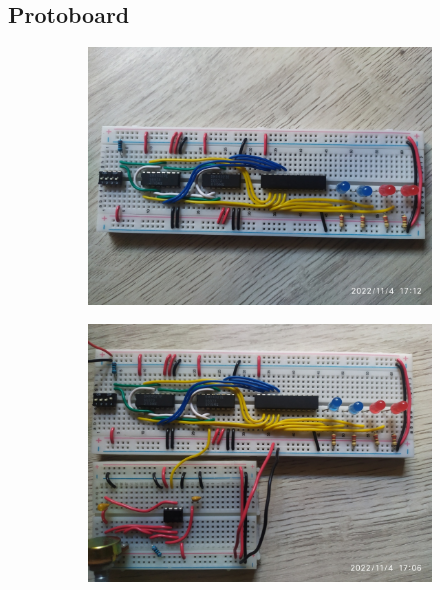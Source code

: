 \documentclass[12pt, oneside]{article}
\begin{document}
\subsection{Protoboard}
\begin{figure}[h!]
    \centering

    \begin{subfigure}{0.45\textwidth}
        \centering
        \includegraphics[width=\linewidth]{figs/IMG_20221104_171242.jpg}
    \end{subfigure}
    \begin{subfigure}{0.45\textwidth}
        \centering
        \includegraphics[width=\linewidth]{figs/IMG_20221104_170607.jpg}
    \end{subfigure}

\end{figure}
\end{document}
